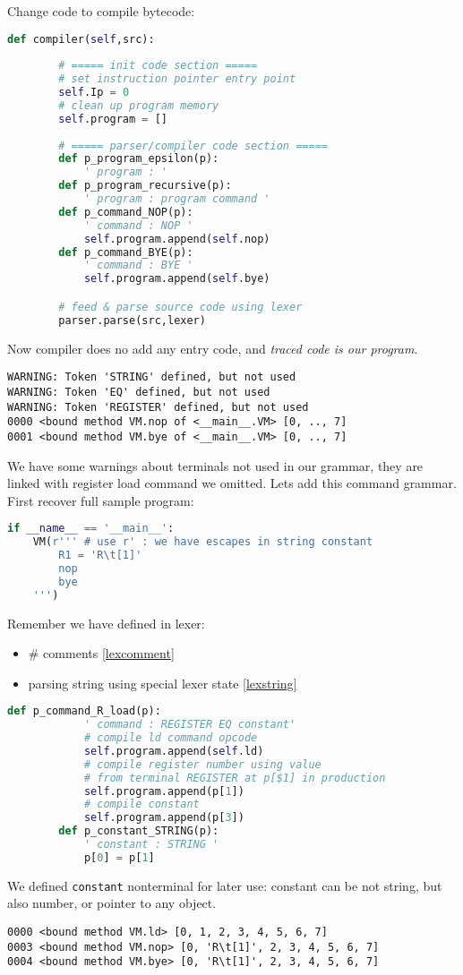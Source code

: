 Change code to compile bytecode:
\begin{lstlisting}[language=python]
	def compiler(self,src):	
	
		# ===== init code section =====
		# set instruction pointer entry point
		self.Ip = 0							
		# clean up program memory
		self.program = []
		
		# ===== parser/compiler code section =====
		def p_program_epsilon(p):
			' program : '
		def p_program_recursive(p):
			' program : program command '
		def p_command_NOP(p):
			' command : NOP '
			self.program.append(self.nop)
		def p_command_BYE(p):
			' command : BYE '
			self.program.append(self.bye)

		# feed & parse source code using lexer
		parser.parse(src,lexer)				
\end{lstlisting}
Now compiler does no add any entry code, and \emph{traced code is our program}.
\begin{lstlisting}
WARNING: Token 'STRING' defined, but not used
WARNING: Token 'EQ' defined, but not used
WARNING: Token 'REGISTER' defined, but not used
0000 <bound method VM.nop of <__main__.VM> [0, .., 7]
0001 <bound method VM.bye of <__main__.VM> [0, .., 7]
\end{lstlisting}
We have some warnings about terminals not used in our grammar, they are linked
with register load command we omitted. Lets add this command grammar. First
recover full sample program:
\begin{lstlisting}[language=python]
if __name__ == '__main__':
	VM(r''' # use r' : we have escapes in string constant
 		R1 = 'R\t[1]'
        nop
        bye
	''')
\end{lstlisting}
Remember we have defined in lexer:
\begin{itemize}
  \item \# comments \ref{lexcomment}
  \item parsing string using special lexer state \ref{lexstring} 
\end{itemize}
\begin{lstlisting}[language=python]
		def p_command_R_load(p):
			' command : REGISTER EQ constant'
			# compile ld command opcode
			self.program.append(self.ld)
			# compile register number using value
			# from terminal REGISTER at p[$1] in production
			self.program.append(p[1])
			# compile constant
			self.program.append(p[3])
		def p_constant_STRING(p):
			' constant : STRING '
			p[0] = p[1]
\end{lstlisting}
We defined \verb|constant| nonterminal for later use: constant can be not
string, but also number, or pointer to any object.
\clearpage
\begin{lstlisting}
0000 <bound method VM.ld> [0, 1, 2, 3, 4, 5, 6, 7]
0003 <bound method VM.nop> [0, 'R\t[1]', 2, 3, 4, 5, 6, 7]
0004 <bound method VM.bye> [0, 'R\t[1]', 2, 3, 4, 5, 6, 7]
\end{lstlisting}

